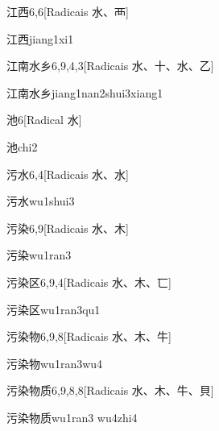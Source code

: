 \begin{entry}{江西}{6,6}[Radicais ⽔、⾑]
  \begin{phonetics}{江西}{jiang1xi1}
  \end{phonetics}
\end{entry}

\begin{entry}{江南水乡}{6,9,4,3}[Radicais ⽔、⼗、⽔、⼄]
  \begin{phonetics}{江南水乡}{jiang1nan2shui3xiang1}
  \end{phonetics}
\end{entry}

\begin{entry}{池}{6}[Radical ⽔]
  \begin{phonetics}{池}{chi2}
  \end{phonetics}
\end{entry}

\begin{entry}{污水}{6,4}[Radicais ⽔、⽔]
  \begin{phonetics}{污水}{wu1shui3}
  \end{phonetics}
\end{entry}

\begin{entry}{污染}{6,9}[Radicais ⽔、⽊]
  \begin{phonetics}{污染}{wu1ran3}
  \end{phonetics}
\end{entry}

\begin{entry}{污染区}{6,9,4}[Radicais ⽔、⽊、⼖]
  \begin{phonetics}{污染区}{wu1ran3qu1}
  \end{phonetics}
\end{entry}

\begin{entry}{污染物}{6,9,8}[Radicais ⽔、⽊、⽜]
  \begin{phonetics}{污染物}{wu1ran3wu4}
  \end{phonetics}
\end{entry}

\begin{entry}{污染物质}{6,9,8,8}[Radicais ⽔、⽊、⽜、⾙]
  \begin{phonetics}{污染物质}{wu1ran3 wu4zhi4}
  \end{phonetics}
\end{entry}


